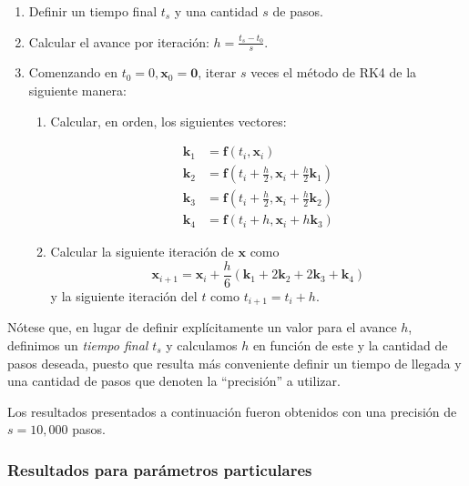 \begin{enumerate}
    \item Definir un tiempo final \(t_s\) y una cantidad \(s\) de pasos.
    \item Calcular el avance por iteración: \(h = \frac{t_s - t_0}{s}\).
    \item Comenzando en \(t_0 = 0, \mathbf{x}_0 = \mathbf{0}\), iterar \(s\) veces el método de RK4 de la siguiente manera:
        \begin{enumerate}

            \item Calcular, en orden, los siguientes vectores:

                \begin{align*}
                    \mathbf{k}_1 &= \mathbf{f}(t_i, \mathbf{x}_i) \\
                    \mathbf{k}_2 &= \mathbf{f}(t_i + \frac{h}{2}, \mathbf{x}_i + \frac{h}{2}\mathbf{k}_1) \\
                    \mathbf{k}_3 &= \mathbf{f}(t_i + \frac{h}{2}, \mathbf{x}_i + \frac{h}{2}\mathbf{k}_2) \\
                    \mathbf{k}_4 &= \mathbf{f}(t_i + h, \mathbf{x}_i + h\mathbf{k}_3)
                \end{align*}

            \item Calcular la siguiente iteración de \(\mathbf{x}\) como
                \[
                    \mathbf{x}_{i+1} = \mathbf{x}_i + \frac{h}{6}(\mathbf{k}_1 + 2\mathbf{k}_2 + 2\mathbf{k}_3 + \mathbf{k}_4)
                \]
                y la siguiente iteración del \(t\) como \(t_{i+1} = t_i + h\).
        \end{enumerate}
\end{enumerate}

Nótese que, en lugar de definir explícitamente un valor para el avance \(h\), definimos un \textit{tiempo final} \(t_s\) y calculamos \(h\) en función de este y la cantidad de pasos deseada, puesto que resulta más conveniente definir un tiempo de llegada y una cantidad de pasos que denoten la ``precisión'' a utilizar.

Los resultados presentados a continuación fueron obtenidos con una precisión de \(s = 10,000\) pasos.

\subsubsection*{Resultados para parámetros particulares}

